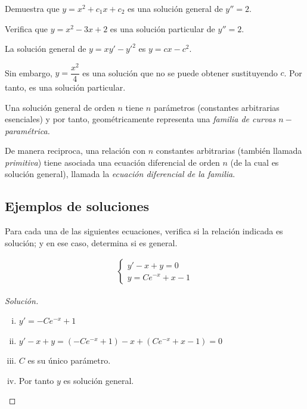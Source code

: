 
	\begin{resuelto}
		\label{exmp 02:06}
		Demuestra que $ y=x^{2}+c_{1}x+c_{2} $ es una solución general de $ y''=2 $.
	\end{resuelto}

	\begin{resuelto}
		\label{exmp 02:08}
		Verifica que $ y = x^2-3x+2 $ es una solución particular de $ y''=2 $.
	\end{resuelto}

	\begin{ejemplo}
		La solución general de $ y = xy'-y'^{2} $ es $ y = cx-c^{2} $.

		 Sin embargo, $ y=\dfrac{x^{2}}{4} $ es una solución que no se puede obtener sustituyendo $ c $.  Por tanto, es una solución particular.
	\end{ejemplo}


\begin{definicion}
	Una solución general de orden $ n $ tiene $ n $ parámetros (constantes arbitrarias esenciales) y por tanto, geométricamente representa una \emph{familia de curvas $n-$paramétrica. }

	De manera reciproca, una relación con $ n $ constantes arbitrarias (también llamada \emph{primitiva}) tiene asociada una ecuación diferencial de orden $n$ (de la cual es solución general), llamada la \emph{ecuación diferencial de la familia}.

\end{definicion}
\subsection{Ejemplos de soluciones}


Para cada una de las siguientes ecuaciones, verifica si la relación indicada es solución; y en ese caso, determina si es general.



\begin{align*}
	\begin{cases}
		y'-x+y=0\\
		y = Ce^{-x}+x-1
	\end{cases}
\end{align*}


\begin{proof}[Solución]
	\begin{enumerate}[(i)]
		\item $y'=-Ce^{-x}+1$
		\item $y'-x+y= (-Ce^{-x}+1)-x+(Ce^{-x}+x-1)=0$
		\item $C$ es su único parámetro.
		\item Por tanto $y$ es solución general.
	\end{enumerate}
\end{proof}


